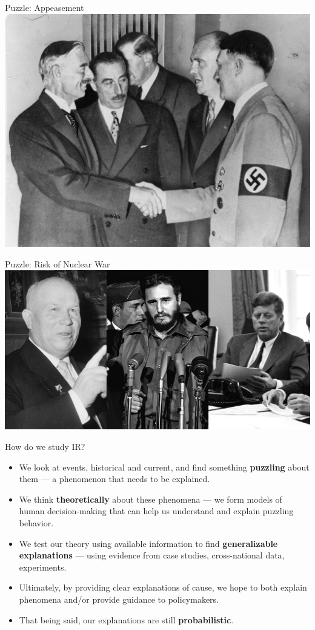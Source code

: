 \documentclass{beamer}
\begin{document}
\begin{frame}{\LARGE Puzzle: Appeasement}
    \centering
\includegraphics[width=\textwidth,height=.9\textheight,keepaspectratio]{Hitler appeasement.jpg}
\end{frame}

\begin{frame}{\LARGE Puzzle: Risk of Nuclear War}
    \centering
\includegraphics[width=\textwidth,height=0.8\textheight,keepaspectratio]{cuban missile crisis.jpg}
\end{frame}


\begin{frame}{\LARGE How do we study IR?}
\begin{itemize}
    \item We look at events, historical and current, and find something \textbf{puzzling} about them --- a phenomenon that needs to be explained. 
    \item We think \textbf{theoretically} about these phenomena --- we form models of human decision-making that can help us understand and explain puzzling behavior. \pause
    \item We test our theory using available information to find \textbf{generalizable explanations} --- using evidence from case studies, cross-national data, experiments. \pause
    \item Ultimately, by providing clear explanations of cause, we hope to both explain phenomena and/or provide guidance to policymakers. \pause
    \item That being said, our explanations are still \textbf{probabilistic}.
    \end{itemize}
\end{frame}
\end{document}
